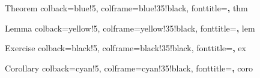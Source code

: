     {Theorem}%
    {%
        colback=blue!5,
        colframe=blue!35!black,
        fonttitle=\bfseries,
    }%
    {thm}%

    {Lemma}%
    {%
        colback=yellow!5,
        colframe=yellow!35!black,
        fonttitle=\bfseries,
    }%
    {lem} %

    {Exercise}%
    {%
        colback=black!5,
        colframe=black!35!black,
        fonttitle=\bfseries,
    }%
    {ex}%

    {Corollary}%
    {%
        colback=cyan!5,
        colframe=cyan!35!black,
        fonttitle=\bfseries,
    }%
    {coro} %

\theoremstyle{proof}
\newtheorem*{pf*}{Proof}
\newenvironment{proof*}{
\begin{pf*}
}{
\hfill $\square{}$.
\end{pf*}
}

\theoremstyle{proof}
\newtheorem*{sol*}{Solution}
\newenvironment{solution*}{
\begin{sol*}
}{
\hfill $\square{}$.
\end{sol*}
}

\theoremstyle{definition}
\addto\captionsenglish{ \renewcommand{\listtheoremname}{B \ List of Definitions} }
\newenvironment{definition}{\begin{shaded}\begin{dfn}}{\end{dfn}\end{shaded}}

\newcommand{\1}[1]{\mathmybb{\bf 1}{\{#1\}}}

\newcommand{\bigSquare}[1]{
\Big[ #1 \Big]
}
\newcommand{\biggSquare}[1]{
\Bigg[ #1 \Bigg]
}

\newcommand{\bigRound}[1]{
\Big( #1 \Big)
}
\newcommand{\biggRound}[1]{
\Bigg( #1 \Bigg)
}

\newcommand{\bigCurl}[1]{
\Big\{ #1 \Big\}
}
\newcommand{\biggCurl}[1]{
\Bigg\{ #1 \Bigg\}
}

\newcommand{\bigAbs}[1]{
\Big| #1 \Big|
}
\newcommand{\biggAbs}[1]{
\Bigg| #1 \Bigg|
}

\DeclareMathOperator*{\esssup}{ess\,sup}

\newcommand{\R}{\mathbb{R}}
\newcommand{\E}{\mathbb{E}}
\newcommand{\Pm}{\mathbb{P}}